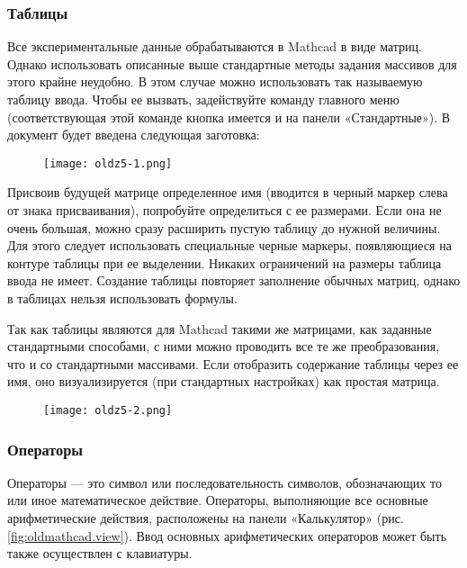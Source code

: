 \subsubsection*{Таблицы}
Все экспериментальные данные обрабатываются в Mathcad в виде матриц. Однако использовать описанные выше стандартные методы задания массивов для этого крайне неудобно. В этом случае можно использовать так называемую таблицу ввода. Чтобы ее вызвать, задействуйте команду  главного меню (соответствующая этой команде кнопка имеется и на панели «Стандартные»). В документ будет введена следующая заготовка:
\begin{figure}[h]
	\begin{center}
		\texttt{[image: oldz5-1.png]}
	\end{center}
\end{figure}

Присвоив будущей матрице определенное имя (вводится в черный маркер слева от знака присваивания), попробуйте определиться с ее размерами. Если она не очень большая, можно сразу расширить пустую таблицу до нужной величины. Для этого следует использовать специальные черные маркеры, появляющиеся на контуре таблицы при ее выделении. Никаких ограничений на размеры таблица ввода не имеет. Создание таблицы повторяет заполнение обычных матриц, однако в таблицах нельзя использовать формулы.

Так как таблицы являются для Mathcad такими же матрицами, как заданные стандартными способами, с ними можно проводить все те же преобразования, что и со стандартными массивами. Если отобразить содержание таблицы через ее имя, оно визуализируется (при стандартных настройках) как простая матрица.

\begin{figure}[h]
	\begin{center}
		\texttt{[image: oldz5-2.png]}
	\end{center}
\end{figure}


\subsubsection{Операторы}
Операторы --- это символ или последовательность символов, обозначающих то или иное математическое действие. Операторы, выполняющие все основные арифметические действия, расположены на панели «Калькулятор» (рис. \ref{fig:oldmathcad.view}). Ввод основных арифметических операторов может быть также осуществлен с клавиатуры.

